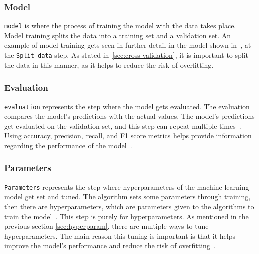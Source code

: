 \subsubsection{Model}\label{subsubsec:machine-learning-pipeline-model-training}
\texttt{model} is where the process of training the model with the data takes place. Model training splits the data into a training set and a validation set. An example of model training gets seen in further detail in the model shown in~\cite{machine-learning-pipeline-architecture}, at the \texttt{Split data} step. As stated in~\ref{sec:cross-validation}, it is important to split the data in this manner, as it helps to reduce the risk of overfitting.

\subsubsection{Evaluation}\label{subsubsec:machine-learning-pipeline-evaluation}
\texttt{evaluation} represents the step where the model gets evaluated. The evaluation compares the model's predictions with the actual values. The model's predictions get evaluated on the validation set, and this step can repeat multiple times~\cite{machine-learning-pipeline-architecture}. Using accuracy, precision, recall, and F1 score metrics helps provide information regarding the performance of the model~\cite{performance-evaluation}.

\subsubsection{Parameters}\label{subsubsec:machine-learning-pipeline-parameters}
\texttt{Parameters} represents the step where hyperparameters of the machine learning model get set and tuned. The algorithm sets some parameters through training, then there are hyperparameters, which are parameters given to the algorithms to train the model~\cite{what-is-hyperparameter-tuning}. This step is purely for hyperparameters. As mentioned in the previous section \ref{sec:hyperparam}, there are multiple ways to tune hyperparameters. The main reason this tuning is important is that it helps improve the model's performance and reduce the risk of overfitting~\cite{hyperparameter-tuning}.






